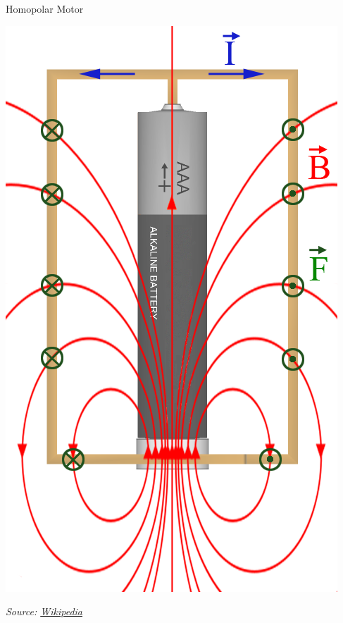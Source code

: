 \documentclass[compress]{beamer}
\newcommand{\source}[2]{{\tiny\it Source: \href{#1}{#2}}}
\begin{document}
\begin{frame}{Homopolar Motor}
\begin{center}
        \includegraphics[height=0.6\paperheight]{image11}
    \end{center}

    \source{https://en.wikipedia.org/wiki/Homopolar_motor}{Wikipedia}
\end{frame}
\end{document}
